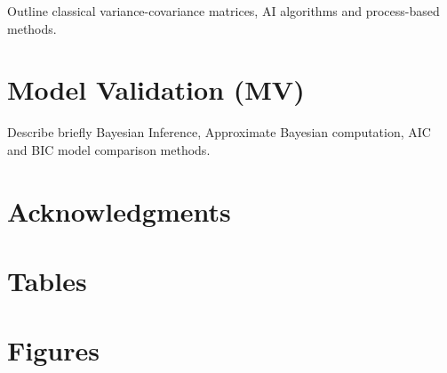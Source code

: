 \documentclass[english,12pt]{article}
\begin{document}
Outline classical variance-covariance matrices, AI
algorithms and process-based methods.

\section{Model Validation (MV)}

Describe briefly Bayesian Inference, Approximate Bayesian computation, AIC and BIC model comparison methods.


\newpage
\section{Acknowledgments}


\newpage



\newpage

\section{Tables}


\newpage

\section{Figures}





\printindex
\end{document}
